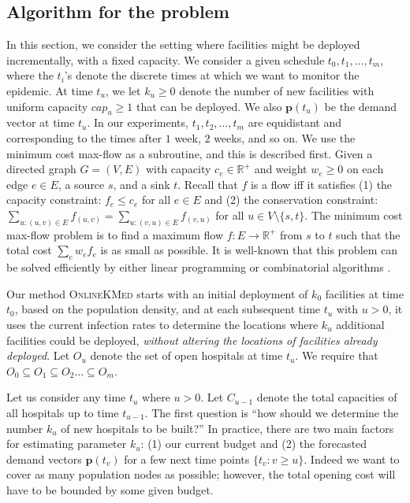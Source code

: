\subsection*{Algorithm for the \probinc{} problem}
In this section, we consider the setting where facilities might be deployed incrementally, with a fixed capacity. 
We consider a given schedule $t_0, t_1, \ldots, t_m$, where the $t_i$'s denote the discrete times at which we want to monitor the epidemic. At time $t_u$, we let $k_u \geq 0$ denote the number of new facilities with uniform capacity $cap_u \geq 1$ that can be deployed. We also $\mathbf{p}(t_u)$ be the demand vector at time $t_u$. In our experiments, $t_1, t_2, \ldots, t_m$ are equidistant and corresponding to the times after $1$ week, $2$ weeks, and so on. 
We use the minimum cost max-flow as a subroutine, and this is described first.
Given a directed graph $G = (V, E)$ with capacity $c_e \in \mathbb{R}^+$ and weight $w_e \geq 0$ on each edge $e \in E$, a source $s$, and a sink $t$. Recall that $f$ is a flow iff it satisfies (1) the capacity constraint: $f_e \leq c_e$ for all $e \in E$ and (2) the conservation constraint: $\sum_{u:(u,v)\in E} f_{(u,v)} = \sum_{u:(v,u) \in E} f_{(v,u)}$ for all $u \in V \setminus \{s, t\}$. The minimum cost max-flow problem is to find a maximum flow $f: E \to \mathbb{R}^+$ from $s$ to $t$ such that the total cost $\sum_e w_e f_e$ is as small as possible.  It is well-known that this problem can be solved efficiently by either linear programming or combinatorial algorithms \cite{flow_book, flow_goldberg, Orlin1997}.


Our method \textsc{OnlineKMed} starts with an initial
deployment of $k_0$ facilities at time $t_0$, based on the population density, and at each subsequent time $t_u$ with $u > 0$, it uses the current infection rates to determine the locations where $k_u$ additional facilities could be deployed, \emph{without altering the locations of facilities already deployed}. 
Let $O_u$ denote the set of open hospitals at time $t_u$. We require that $O_0 \subseteq O_1 \subseteq O_2 \ldots \subseteq O_m$.

Let us consider any time $t_u$ where $u > 0$. Let $C_{u-1}$ denote the total capacities of all hospitals up to time $t_{u-1}$. The first question is ``how should we determine the number $k_u$ of new hospitals to be built?'' In practice, there are two main factors for estimating parameter $k_u$: (1) our current budget and (2) the forecasted demand vectors $\mathbf{p}(t_v)$ for a few next time points $\{t_v: v \geq u\}$. Indeed we want to cover as many population nodes as possible; however, the total opening cost will have to be bounded by some given budget.

